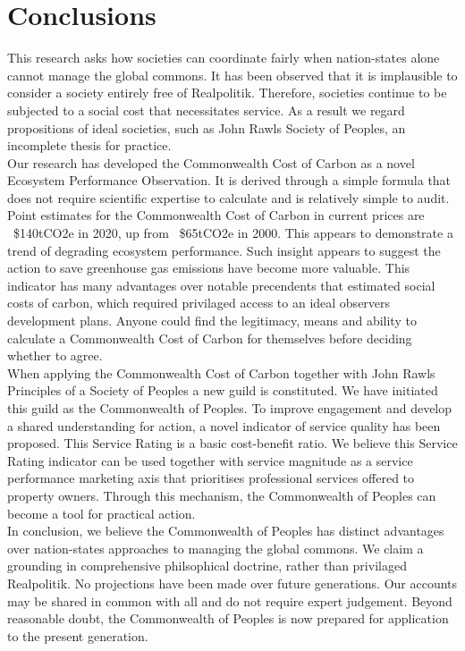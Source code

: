 \documentclass[12pt, oneside]{article}   	%
\begin{document}
\section{Conclusions}

This research asks how societies can coordinate fairly when nation-states alone cannot manage the global commons.
It has been observed that it is implausible to consider a society entirely free of Realpolitik.
Therefore, societies continue to be subjected to a social cost that necessitates service.
As a result we regard propositions of ideal societies, such as John Rawls Society of Peoples, an incomplete thesis for practice.\\

Our research has developed the Commonwealth Cost of Carbon as a novel Ecosystem Performance Observation.
It is derived through a simple formula that does not require scientific expertise to calculate and is relatively simple to audit.
Point estimates for the Commonwealth Cost of Carbon in current prices are ~\$140tCO2e in 2020, up from ~\$65tCO2e in 2000.
This appears to demonstrate a trend of degrading ecosystem performance.
Such insight appears to suggest the action to save greenhouse gas emissions have become more valuable.
This indicator has many advantages over notable precendents that estimated social costs of carbon, which required privilaged access to an ideal observers development plans.
Anyone could find the legitimacy, means and ability to calculate a Commonwealth Cost of Carbon for themselves before deciding whether to agree.\\

When applying the Commonwealth Cost of Carbon together with John Rawls Principles of a Society of Peoples a new guild is constituted.
We have initiated this guild as the Commonwealth of Peoples.
To improve engagement and develop a shared understanding for action, a novel indicator of service quality has been proposed.
This Service Rating is a basic cost-benefit ratio.
We believe this Service Rating indicator can be used together with service magnitude as a service performance marketing axis that prioritises professional services offered to property owners.
Through this mechanism, the Commonwealth of Peoples can become a tool for practical action.\\

In conclusion, we believe the Commonwealth of Peoples has distinct advantages over nation-states approaches to managing the global commons.
We claim a grounding in comprehensive philsophical doctrine, rather than privilaged Realpolitik.
No projections have been made over future generations.
Our accounts may be shared in common with all and do not require expert judgement.
Beyond reasonable doubt, the Commonwealth of Peoples is now prepared for application to the present generation.\\
\end{document}
